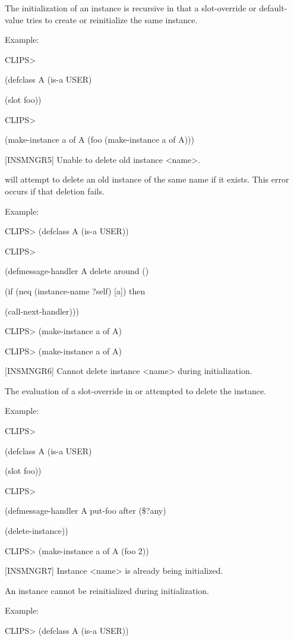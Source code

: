 \documentclass[letterpaper,10pt,english]{sphinxmanual}
\begin{document}
The initialization of an instance is recursive in that a slot-override
or default-value tries to create or reinitialize the same instance.

Example:

CLIPS\textgreater{}

(defclass A (is-a USER)

(slot foo))

CLIPS\textgreater{}

(make-instance a of A (foo (make-instance a of A)))

{[}INSMNGR5{]} Unable to delete old instance \textless{}name\textgreater{}.

 will attempt to delete an old instance of the same
name if it exists. This error occurs if that deletion fails.

Example:

CLIPS\textgreater{} (defclass A (is-a USER))

CLIPS\textgreater{}

(defmessage-handler A delete around ()

(if (neq (instance-name ?self) {[}a{]}) then

(call-next-handler)))

CLIPS\textgreater{} (make-instance a of A)

CLIPS\textgreater{} (make-instance a of A)

{[}INSMNGR6{]} Cannot delete instance \textless{}name\textgreater{} during initialization.

The evaluation of a slot-override in  or
 attempted to delete the instance.

Example:

CLIPS\textgreater{}

(defclass A (is-a USER)

(slot foo))

CLIPS\textgreater{}

(defmessage-handler A put-foo after (\$?any)

(delete-instance))

CLIPS\textgreater{} (make-instance a of A (foo 2))

{[}INSMNGR7{]} Instance \textless{}name\textgreater{} is already being initialized.

An instance cannot be reinitialized during initialization.

Example:

CLIPS\textgreater{} (defclass A (is-a USER))
\end{document}
